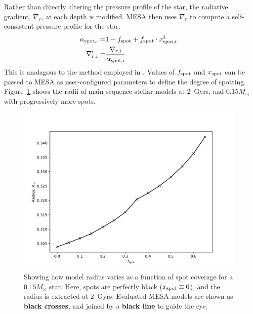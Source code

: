 Rather than directly altering the pressure profile of the star, the radiative gradient, $\nabla_r$, at each depth is modified. MESA then uses $\nabla_r$ to compute a self-consistent pressure profile for the star.
\begin{align}
    \alpha_{\rm spot, i} =& 1 - f_{\rm spot} + f_{\rm spot} \cdot x_{\rm spot, i}^4 \\
    \nabla_{r,i}' =& \frac{\nabla_{r,i}}{\alpha_{\rm spot, i}}
\end{align}
This is analagous to the method employed in \citet{sommers2015}.
Values of $f_{\rm spot}$ and $x_{\rm spot}$ can be passed to MESA as user-configured parameters to define the degree of spotting. Figure~\ref{fig:modelling:spotted model radii at 2Gyrs} shows the radii of main sequence stellar models at 2~Gyrs, and $0.15 M_\odot$ with progressively more spots.
\begin{figure}
    \centering
    \includegraphics[width=\textwidth]{figures/modelling/spotted_model_radii_at_2gyrs.pdf}
    \caption{Showing how model radius varies as a function of spot coverage for a $0.15 M_\odot$ star. Here, spots are perfectly black ($x_{\rm spot} \equiv 0$), and the radius is extracted at 2~Gyrs. Evaluated MESA models are shown as {\bf black crosses}, and joined by a {\bf black line} to guide the eye.}
    \label{fig:modelling:spotted model radii at 2Gyrs}
\end{figure}


